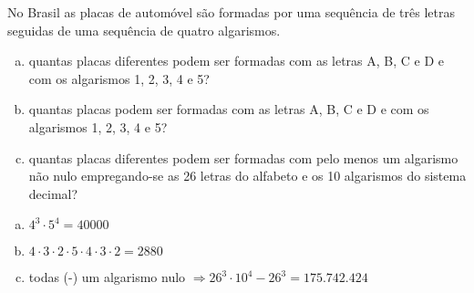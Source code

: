 \begin{ex}
No Brasil as placas de automóvel são formadas por uma sequência de três letras seguidas de uma sequência de quatro algarismos.
   \begin{enumerate}[(a)]
   \item quantas placas diferentes podem ser formadas com as letras A,  B, C e D e com os algarismos 1, 2, 3, 4 e 5?
   \item quantas placas podem ser formadas com as letras A, B, C e D e com os algarismos 1, 2, 3, 4 e 5?
   \item quantas placas diferentes podem ser formadas com pelo menos um algarismo não nulo empregando-se as 26 letras do alfabeto e os 10 algarismos do sistema decimal?
   \end{enumerate}
    \begin{sol}
      \phantom{A} 
        \begin{enumerate} [(a)]
            \item $4^3\cdot5^4=40000$
            \item $4\cdot3\cdot2\cdot5\cdot4\cdot3\cdot2=2880$
            \item todas (-) um algarismo nulo $\Longrightarrow 26^3\cdot10^4-26^3=175.742.424$
        \end{enumerate}
    \end{sol}
\end{ex}